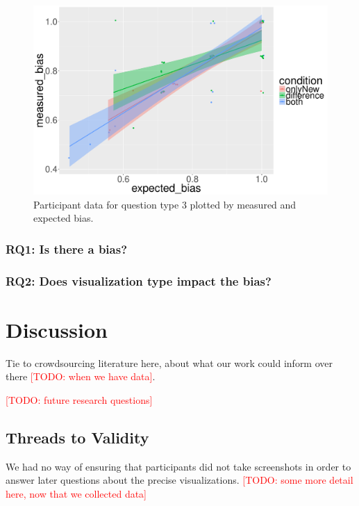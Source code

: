 \documentclass[10pt,journal,compsoc]{IEEEtran}
\newcommand{\note}[2]{\textcolor{#1}{[#2]}}
\newcommand{\todo}[1]{\note{red}{TODO: #1}}
\begin{document}
\begin{figure}[!t]
  \centering
  \includegraphics[width=\columnwidth]{jaccard_precise_jitter.pdf}
  \caption{Participant data for question type 3 plotted by measured and expected bias.}
  \label{figure_q3}
\end{figure}

\subsubsection{RQ1: Is there a bias?}

\subsubsection{RQ2: Does visualization type impact the bias?}

\section{Discussion}\label{sec:discussion}

Tie to crowdsourcing literature here, about what our work could inform over there \todo{when we have data}.

\todo{future research questions}

\subsection{Threads to Validity} %

We had no way of ensuring that participants did not take screenshots in order to answer later questions about the precise visualizations.
\todo{some more detail here, now that we collected data}
\end{document}

